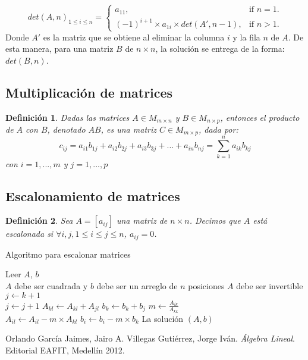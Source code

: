 \documentclass[12pt]{article}
\newtheorem{definition}{Definición}[section]
\begin{document}
	\begin{equation}
	det(A, n)_{1\leq i \leq n}=\begin{cases}
	a_{11}, & \text{if $n = 1$}.\\
	(-1)^{i+1} \times a_{1i} \times det(A', n - 1) , & \text{if $n > 1$}.
	\end{cases}
	\end{equation}
	Donde $A'$ es la matriz que se obtiene al eliminar la columna $i$ y la fila $n$ de $A$. De esta manera, para una matriz $B$ de $n \times n$, la solución se entrega de la forma:
	$det(B, n)$.
	
	\subsection{Multiplicación de matrices}
	\begin{definition}
		Dadas las matrices $A \in M_{m\times n}$ y $B \in M_{n\times p}$, entonces el producto de $A$ con $B$, denotado $AB$, es una matriz $C \in M_{m\times p}$, dada por: \cite{algebralineal}
		\[
			c_{ij} = a_{i1}b_{1j} + a_{i2}b_{2j} + a_{i3}b_{3j} + \dots + a_{in}b_{nj} = \sum_{k = 1}^{n}{a_{ik}b_{kj}}		
		\]
		con $i = 1, ..., m$ y $j = 1, ..., p$
	\end{definition}
	\subsection{Escalonamiento de matrices}
	\begin{definition}
		Sea $A = [a_{ij}]$ una matriz de $n \times n$. Decimos que $A$ está escalonada si $\forall{i,j}, 1\leq i \leq j \leq n$, $a_{ij} = 0$.
	\end{definition}
	\begin{algorithm}[H]
		\caption{Algoritmo para escalonar matrices}
		Leer $A$, $b$ \\
		{$A$ debe ser cuadrada y $b$ debe ser un arreglo de $n$ posiciones}
		{$A$ debe ser invertible}
		\Else
		{
			{
				{
					$j \leftarrow k + 1$\\
					{
						$j \leftarrow j + 1$
					}
					{
						{
							$A_{kl} \leftarrow A_{kl} + A_{jl}$
						}
						$b_k \leftarrow b_k + b_j$
					}
				}
				{
					{
						$m \leftarrow \frac{A_{ik}}{A_{kk}}$\\
						{
							$A_{il} \leftarrow A_{il} - m\times A_{kl}$
						}
						$b_i \leftarrow b_i - m \times b_k$
					}
				}
			}
		}
		La solución $(A, b)$
	\end{algorithm}
	\begin{thebibliography}{9}
		Orlando García Jaimes, Jairo A. Villegas Gutiérrez, Jorge Iván. \textit{Álgebra Lineal}. Editorial EAFIT, Medellín 2012. 
	\end{thebibliography}
\end{document}
